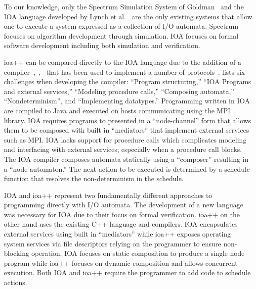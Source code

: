 To our knowledge, only the Spectrum Simulation System of Goldman~\cite{goldman1990distributed} and the IOA language developed by Lynch et al.~\cite{garland2003ioa} are the only existing systems that allow one to execute a system expressed as a collection of I/O automata.
Spectrum focuses on algorithm development through simulation.
IOA focuses on formal software development including both simulation and verification.

ioa++ can be compared directly to the IOA language due to the addition of a compiler~\cite{tsai2002code},~\cite{tauber2004verifiable},~\cite{tauber2004compiling} that has been used to implement a number of protocols~\cite{georgiou2009automated}.
\cite{georgiou2009automated} lists six challenges when developing the compiler: ``Program structuring,'' ``IOA Programs and external services,'' ``Modeling procedure calls,'' ``Composing automata,'' ``Nondeterminism'', and ``Implementing datatypes.''
Programming written in IOA are compiled to Java and executed on hosts communicating using the MPI library.
IOA requires programs to presented in a ``node-channel'' form that allows them to be composed with built in ``mediators'' that implement external services such as MPI.
IOA lacks support for procedure calls which complicates modeling and interfacing with external services; especially when a procedure call blocks.
The IOA compiler composes automata statically using a ``composer'' resulting in a ``node automaton.''
The next action to be executed is determined by a schedule function that resolves the non-determinism in the schedule.

IOA and ioa++ represent two fundamentally different approaches to programming directly with I/O automata.
The development of a new language was necessary for IOA due to their focus on formal verification.
ioa++ on the other hand uses the existing C++ language and compilers.
IOA encapsulates external services using built in ``mediators'' while ioa++ exposes operating system services via file descriptors relying on the programmer to ensure non-blocking operation.
IOA focuses on static composition to produce a single node program while ioa++ focuses on dynamic composition and allows concurrent execution.
Both IOA and ioa++ require the programmer to add code to schedule actions.










